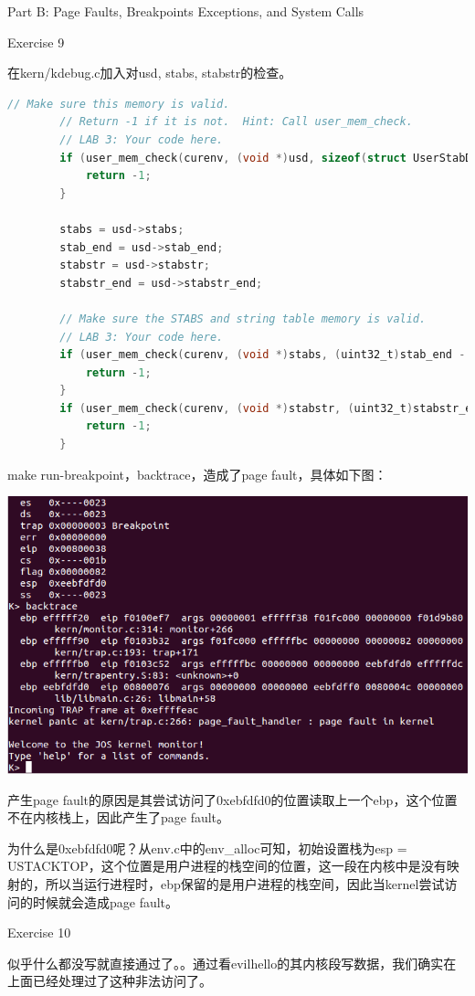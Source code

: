 \documentclass[GBK,winfonts,a4paper,10pt]{ctexart}
\begin{document}
\begin{section}{ Part B: Page Faults, Breakpoints Exceptions, and System Calls }
\begin{subsection}{ Exercise 9 }
\par
在kern/kdebug.c加入对usd, stabs, stabstr的检查。
\begin{lstlisting}[language=C]
		// Make sure this memory is valid.
		// Return -1 if it is not.  Hint: Call user_mem_check.
		// LAB 3: Your code here.
		if (user_mem_check(curenv, (void *)usd, sizeof(struct UserStabData), PTE_U) < 0) {
			return -1;
		}

		stabs = usd->stabs;
		stab_end = usd->stab_end;
		stabstr = usd->stabstr;
		stabstr_end = usd->stabstr_end;

		// Make sure the STABS and string table memory is valid.
		// LAB 3: Your code here.
		if (user_mem_check(curenv, (void *)stabs, (uint32_t)stab_end - (uint32_t)stabs, PTE_U) < 0) {
			return -1;
		}
		if (user_mem_check(curenv, (void *)stabstr, (uint32_t)stabstr_end - (uint32_t)stabstr, PTE_U) < 0) {
			return -1;
		}
\end{lstlisting}
\par
make run-breakpoint，backtrace，造成了page fault，具体如下图：
\par
\includegraphics[scale=0.5]{backtrace.png}
\par
产生page fault的原因是其尝试访问了0xebfdfd0的位置读取上一个ebp，这个位置不在内核栈上，因此产生了page fault。
\par
为什么是0xebfdfd0呢？从env.c中的env\_alloc可知，初始设置栈为esp = USTACKTOP，这个位置是用户进程的栈空间的位置，这一段在内核中是没有映射的，所以当运行进程时，ebp保留的是用户进程的栈空间，因此当kernel尝试访问的时候就会造成page fault。	
\end{subsection}

\begin{subsection}{ Exercise 10 }
\par
似乎什么都没写就直接通过了。。通过看evilhello的其内核段写数据，我们确实在上面已经处理过了这种非法访问了。
\end{subsection}


\end{section}
\end{document}
